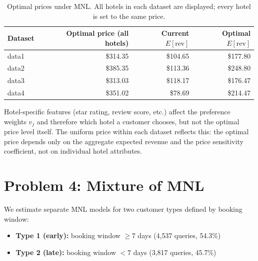 \documentclass[11pt]{article}
\begin{document}
\begin{table}[h]
\centering
\begin{tabular}{lrrr}
\toprule
Dataset & Optimal price (all hotels) & Current $E[\text{rev}]$ & Optimal $E[\text{rev}]$ \\
\midrule
data1 & \$314.35 & \$104.65 & \$177.80 \\
data2 & \$385.35 & \$113.36 & \$248.80 \\
data3 & \$313.03 & \$118.17 & \$176.47 \\
data4 & \$351.02 & \$78.69  & \$214.47 \\
\bottomrule
\end{tabular}
\caption{Optimal prices under MNL. All hotels in each dataset are displayed; every hotel is set to the same price.}
\end{table}

Hotel-specific features (star rating, review score, etc.) affect the preference weights $v_j$ and therefore which hotel a customer chooses, but not the optimal price level itself. The uniform price within each dataset reflects this: the optimal price depends only on the aggregate expected revenue and the price sensitivity coefficient, not on individual hotel attributes.

\section{Problem 4: Mixture of MNL}

We estimate separate MNL models for two customer types defined by booking window:
\begin{itemize}
  \item \textbf{Type 1 (early):} booking window $\geq 7$ days (4,537 queries, 54.3\%)
  \item \textbf{Type 2 (late):} booking window $< 7$ days (3,817 queries, 45.7\%)
\end{itemize}
\end{document}
